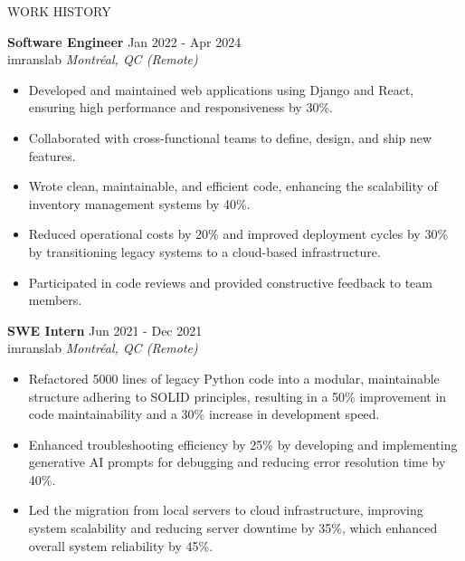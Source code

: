 \documentclass{resume} %
\begin{document}
\begin{rSection}{WORK HISTORY}

\textbf{Software Engineer} \hfill Jan 2022 - Apr 2024\\
imranslab \hfill \textit{Montréal, QC (Remote)}
 \begin{itemize}
    \item Developed and maintained web applications using Django and React, ensuring high performance and responsiveness by 30\%.
    \item Collaborated with cross-functional teams to define, design, and ship new features.
    \item Wrote clean, maintainable, and efficient code, enhancing the scalability of inventory management systems by 40\%.
    \item Reduced operational costs by 20\% and improved deployment cycles by 30\% by transitioning legacy systems to a cloud-based infrastructure.
    \item Participated in code reviews and provided constructive feedback to team members.
 \end{itemize}

\textbf{SWE Intern} \hfill Jun 2021 - Dec 2021\\
imranslab \hfill \textit{Montréal, QC (Remote)}
 \begin{itemize}
    \item Refactored 5000 lines of legacy Python code into a modular, maintainable structure adhering to SOLID principles, resulting in a 50\% improvement in code maintainability and a 30\% increase in development speed.
    \item Enhanced troubleshooting efficiency by 25\% by developing and implementing generative AI prompts for debugging and reducing error resolution time by 40\%.
    \item Led the migration from local servers to cloud infrastructure, improving system scalability and reducing server downtime by 35\%, which enhanced overall system reliability by 45\%.
 \end{itemize}

\end{rSection} 

\end{document}
